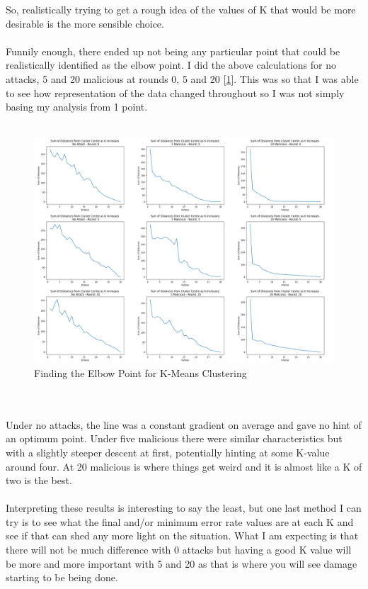 So, realistically trying to get a rough idea of the values of K that would be more desirable is the more sensible choice.
\\ \\
Funnily enough, there ended up not being any particular point that could be realistically identified as the elbow point.
I did the above calculations for no attacks, 5 and 20 malicious at rounds 0, 5 and 20 [\ref{fig:k_elbow}].
This was so that I was able to see how representation of the data changed throughout so I was not simply basing my analysis from 1 point.
\\ \\
\begin{figure}[htbp]
	\centering
    \includegraphics[scale=0.25]{my_agg/graphs/k_elbow.png}
	\caption{Finding the Elbow Point for K-Means Clustering}
	\label{fig:k_elbow}
\end{figure}
\\ \\
Under no attacks, the line was a constant gradient on average and gave no hint of an optimum point.
Under five malicious there were similar characteristics but with a slightly steeper descent at first, potentially hinting at some K-value around four.
At 20 malicious is where things get weird and it is almost like a K of two is the best.
\\ \\
Interpreting these results is interesting to say the least, but one last method I can try is to see what the final and/or minimum error rate values are at each K and see if that can shed any more light on the situation.
What I am expecting is that there will not be much difference with 0 attacks but having a good K value will be more and more important with 5 and 20 as that is where you will see damage starting to be being done.
